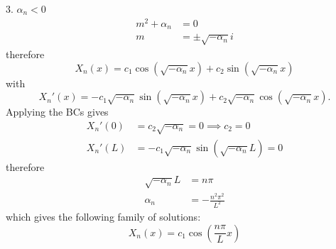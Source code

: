 \documentclass{article}
\begin{document}
\begin{proofcase}{3. \(\alpha_n < 0\)}\let\qed\relax
    \begin{align*}
        m^2 + \alpha_n & = 0                      \\
        m              & = \pm \sqrt{-\alpha_n} i
    \end{align*}
    therefore
    \begin{equation*}
        X_n\left( x \right) = c_1 \cos{\left( \sqrt{-\alpha_n} x \right)} + c_2 \sin{\left( \sqrt{-\alpha_n} x \right)}
    \end{equation*}
    with
    \begin{equation*}
        X_n'\left( x \right) = -c_1 \sqrt{-\alpha_n} \sin{\left( \sqrt{-\alpha_n} x \right)} + c_2 \sqrt{-\alpha_n} \cos{\left( \sqrt{-\alpha_n} x \right)}.
    \end{equation*}
    Applying the BCs gives
    \begin{align*}
        X_n'\left( 0 \right) & = c_2 \sqrt{-\alpha_n} = 0 \implies c_2 = 0                         \\
        X_n'\left( L \right) & = -c_1 \sqrt{-\alpha_n} \sin{\left( \sqrt{-\alpha_n} L \right)} = 0
    \end{align*}
    therefore
    \begin{align*}
        \sqrt{-\alpha_n} L & = n \pi                  \\
        \alpha_n           & = -\frac{n^2 \pi^2}{L^2}
    \end{align*}
    which gives the following family of solutions:
    \begin{equation*}
        X_n\left( x \right) = c_1 \cos{\left( \frac{n \pi}{L} x \right)}
    \end{equation*}
\end{proofcase}
\end{document}
